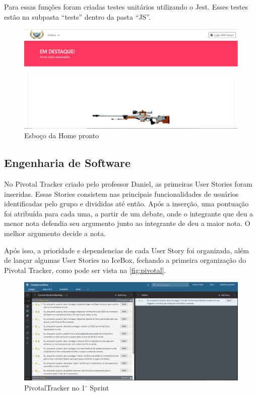 Para essas funções foram criadas testes unitários utilizando o Jest. Esses testes estão na subpasta ``tests'' 
dentro da pasta ``JS''.\\

\begin{figure}[!htb]
	\centering
	\includegraphics[scale=0.4]{Imagens/Home.png}
	\caption{Esboço da Home pronto}
	\label{fig:home}
\end{figure}

\subsection{Engenharia de Software}
No Pivotal Tracker criado pelo professor Daniel, as primeiras User Stories foram inseridas. Essas Stories consistem 
nas principais funcionalidades de usuários identificadas pelo grupo e divididas até então. Após a inserção, 
uma pontuação foi atribuída para cada uma, a partir de um debate, onde o integrante que deu a menor nota defendia seu argumento 
junto ao integrante de deu a maior nota. O melhor argumento decide a nota.

Após isso, a prioridade e dependencias de cada User Story foi organizada, além de lançar algumas User Stories no IceBox, fechando a primeira organização do Pivotal Tracker, como pode ser vista na \autoref{fig:pivotal}.\\

\begin{figure}[!htb]
	\centering
	\includegraphics[scale=0.4]{Imagens/Pivotal1.png}
	\caption{PivotalTracker no 1$^{\circ}$ Sprint}
	\label{fig:pivotal}
\end{figure}

